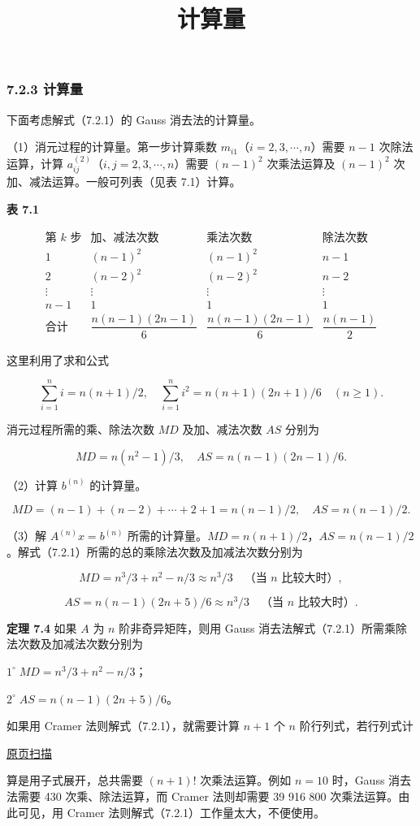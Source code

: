 \documentclass[
  10pt,
  fontset=fandol]{ctexart}
\title{计算量}
\author{}
\date{}
\begin{document}
\maketitle

\subsubsection{7.2.3 计算量}\label{ux8ba1ux7b97ux91cf}

下面考虑解式（7.2.1）的 Gauss 消去法的计算量。

（1）消元过程的计算量。第一步计算乘数 \(m_{i1}\)（\(i=2,3,\cdots,n\)）需要 \(n-1\) 次除法运算，计算 \(a_{ij}^{(2)}\)（\(i,j=2,3,\cdots,n\)）需要 \((n-1)^2\) 次乘法运算及 \((n-1)^2\) 次加、减法运算。一般可列表（见表 7.1）计算。

\textbf{表 7.1}

\[
\begin{array}{c|c|c|c}
\text{第 }k\text{ 步}&\text{加、减法次数}&\text{乘法次数}&\text{除法次数}\\\hline
1&(n-1)^2&(n-1)^2&n-1\\
2&(n-2)^2&(n-2)^2&n-2\\
\vdots&\vdots&\vdots&\vdots\\
n-1&1&1&1\\\hline
\text{合计}&\dfrac{n(n-1)(2n-1)}{6}&\dfrac{n(n-1)(2n-1)}{6}&\dfrac{n(n-1)}{2}
\end{array}
\]

这里利用了求和公式

\[\sum_{i=1}^{n}i=n(n+1)/2,\quad \sum_{i=1}^{n}i^2=n(n+1)(2n+1)/6\quad(n\ge1).\]

消元过程所需的乘、除法次数 \(MD\) 及加、减法次数 \(AS\) 分别为

\[MD=n(n^2-1)/3,\quad AS=n(n-1)(2n-1)/6.\]

（2）计算 \(b^{(n)}\) 的计算量。

\[MD=(n-1)+(n-2)+\cdots+2+1=n(n-1)/2,\quad AS=n(n-1)/2.\]

（3）解 \(A^{(n)}x=b^{(n)}\) 所需的计算量。\(MD=n(n+1)/2\)，\(AS=n(n-1)/2\)。解式（7.2.1）所需的总的乘除法次数及加减法次数分别为

\[MD=n^3/3+n^2-n/3\approx n^3/3\quad\text{（当 $n$ 比较大时）},\]

\[AS=n(n-1)(2n+5)/6\approx n^3/3\quad\text{（当 $n$ 比较大时）}.\]

\textbf{定理 7.4} 如果 \(A\) 为 \(n\) 阶非奇异矩阵，则用 Gauss 消去法解式（7.2.1）所需乘除法次数及加减法次数分别为

\(1^\circ\;MD=n^3/3+n^2-n/3\)；

\(2^\circ\;AS=n(n-1)(2n+5)/6\)。

如果用 Cramer 法则解式（7.2.1），就需要计算 \(n+1\) 个 \(n\) 阶行列式，若行列式计

\href{../../source-images/pdf-184.jpeg}{原页扫描}

算是用子式展开，总共需要 \((n+1)!\) 次乘法运算。例如 \(n=10\) 时，Gauss 消去法需要 430 次乘、除法运算，而 Cramer 法则却需要 39 916 800 次乘法运算。由此可见，用 Cramer 法则解式（7.2.1）工作量太大，不便使用。
\end{document}
